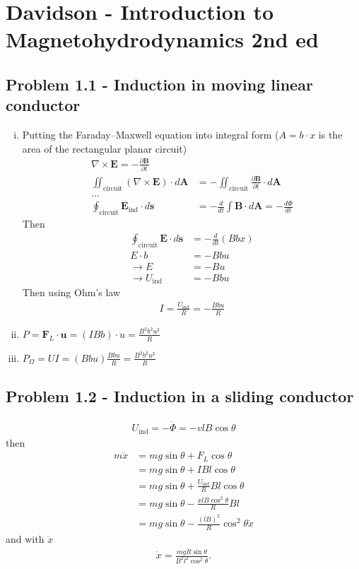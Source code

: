 \documentclass[../main.tex]{subfiles}
\begin{document}
\section{{\sc Davidson} - Introduction to Magnetohydrodynamics 2nd ed}

\subsection{Problem 1.1 - Induction in moving linear conductor}
\begin{enumerate}[(i)]
\item Putting the Faraday–Maxwell equation into integral form ($A=b\cdot x$  is the area of the rectangular planar circuit)
\begin{align}
\nabla\times\mathbf{E}=-\frac{\partial\mathbf{B}}{\partial t}\\
\iint_\text{circuit}(\nabla\times\mathbf{E})\cdot d\mathbf{A}&=-\iint_\text{circuit}\frac{\partial\mathbf{B}}{\partial t}\cdot d\mathbf{A}\\
...\\
\oint_\text{circuit}\mathbf{E}_\text{ind}\cdot d\mathbf{s}&=-\frac{d}{dt}\int\mathbf{B}\cdot d\mathbf{A}=-\frac{d\Phi}{dt}
\end{align}
Then
\begin{align}
\oint_\text{circuit}\mathbf{E}\cdot d\mathbf{s}&=- \frac{d}{dt}(Bbx)\\
E\cdot b&= -Bbu\\
\rightarrow E&=-Bu\\
\rightarrow U_\text{ind}&=-Bbu
\end{align}
Then using Ohm's law
\begin{align}
I=\frac{U_\text{ind}}{R}=-\frac{Bbu}{R}
\end{align}

\item $P=\mathbf{F}_L\cdot\mathbf{u}=(IBb)\cdot u=\frac{B^2b^2u^2}{R}$
\item $P_\Omega=UI=(Bbu)\frac{Bbu}{R}=\frac{B^2b^2u^2}{R}$
\end{enumerate}

\subsection{Problem 1.2 - Induction in a sliding conductor}
\begin{align}
U_\text{ind}=-\dot\Phi=-vlB\cos\theta
\end{align}
then
\begin{align}
m\ddot{x}
&=mg\sin\theta+F_L\cos\theta\\
&=mg\sin\theta+IBl\cos\theta\\
&=mg\sin\theta+\frac{U_\text{ind}}{R}Bl\cos\theta\\
&=mg\sin\theta-\frac{\dot{x}lB\cos^2\theta}{R}Bl\\
&=mg\sin\theta-\frac{(lB)^2}{R}\cos^2\theta\dot{x}
\end{align}
and with $\ddot{x}$
\begin{align}
\dot{x}=\frac{mgR\sin\theta}{B^2l^2\cos^2\theta}.
\end{align}
\end{document}
